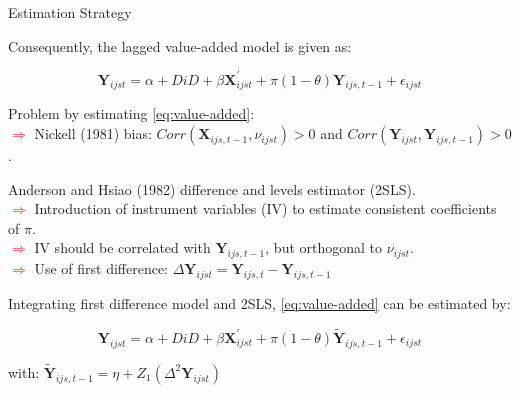 \documentclass{beamer}
\begin{document}
\begin{frame}[label=Main6]{Estimation Strategy}
\vspace{-42pt} \flushright \hyperlink{Bibliography1}{\beamerbutton{\textcolor{red}{Papers}}}
\vspace{15pt}
\begin{itemize} 
{\footnotesize\item Consequently, the lagged value-added model is given as:}

\begin{equation} \label{eq:value-added}
\mathbf{Y}_{ijst} = \alpha + DiD + \beta \mathbf{X}_{ijst}^{\prime} + \pi (1 - \theta) \mathbf{Y}_{ijs,t-1} + \epsilon_{ijst} 
\end{equation}

{\scriptsize Problem by estimating \eqref{eq:value-added}: \vspace{-5pt}
\\ \tiny\textcolor{red}{$\Longrightarrow$} Nickell (1981) bias: $Corr(\mathbf{X}_{ijs,t-1}, \nu_{ijst}) > 0$ and $Corr(\mathbf{Y}_{ijst}, \mathbf{Y}_{ijs,t-1}) > 0$.}


\vspace{15pt}
{\footnotesize\item Anderson and Hsiao (1982) difference and levels estimator (2SLS).
\\ \tiny\textcolor{red}{$\Longrightarrow$} Introduction of instrument variables (IV) to estimate consistent coefficients of $\pi$.
\\ \tiny\textcolor{red}{$\Longrightarrow$} IV should be correlated with $\mathbf{Y}_{ijs,t-1}$, but orthogonal to $\nu_{ijst}$. \vspace{-7pt}
\\ \tiny\textcolor{red}{$\Longrightarrow$} Use of first difference: $\Delta \mathbf{Y}_{ijst} = \mathbf{Y}_{ijs,t} - \mathbf{Y}_{ijs,t-1}$}

\vspace{15pt}
{\footnotesize\item Integrating first difference model and 2SLS, \eqref{eq:value-added} can be estimated by:}

\begin{equation} \label{eq:2SLS}
\mathbf{Y}_{ijst} = \alpha + DiD + \beta \mathbf{X}_{ijst}^{\prime} + \pi (1 - \theta) \widetilde{\mathbf{Y}}_{ijs,t-1} + \epsilon_{ijst} 
\end{equation}

{\scriptsize with: \hspace{80pt} $\widetilde{\mathbf{Y}}_{ijs,t-1} = \eta + Z_1(\Delta^2 \mathbf{Y}_{ijst})$}

\end{itemize}
\end{frame}
\end{document}
